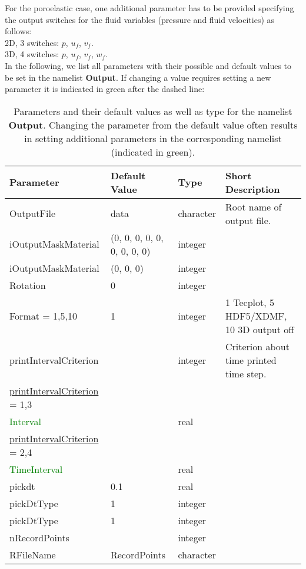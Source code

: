\documentclass[12pt,twoside]{article}
\begin{document}
\noindent
For the poroelastic case, one additional parameter has to be provided specifying the output switches for the fluid variables
(pressure and fluid velocities) as follows:\\
2D, 3 switches: $p$, $u_f$, $v_f$.\\
3D, 4 switches: $p$, $u_f$, $v_f$, $w_f$.\\

In the following, we list all parameters with their possible and default values to be set in the namelist \textbf{Output}.
If changing a value requires setting a new parameter it is indicated in green after the dashed line:\\

\begin{table}[H]
\caption{Parameters and their default values as well as type for the namelist \textbf{Output}.
         Changing the parameter from the default value often results in setting additional parameters
         in the corresponding namelist (indicated in green).}
\begin{center}
\begin{tabular}{|p{4cm}|p{2.7cm}|p{2cm}|p{4cm}|}
\hline
Parameter & Default Value & Type & Short Description \\
\hline
\hline
OutputFile & data & character & Root name of output file. \\
iOutputMaskMaterial & (0, 0, 0, 0, 0, 0, 0, 0, 0) & integer & \\
iOutputMaskMaterial & (0, 0, 0) & integer & \\
Rotation & 0 & integer & \\
Format = 1,5,10 & 1 & integer & 1 Tecplot, 5 HDF5/XDMF, 10 3D output off \\
printIntervalCriterion &  & integer & Criterion about time printed time step.\\
\hdashline
\uline{printIntervalCriterion} = 1,3 & & & \\
\textcolor{green}{Interval} & & real & \\
\hdashline
\uline{printIntervalCriterion} = 2,4 & & & \\
\textcolor{green}{TimeInterval} & & real & \\
\hline
pickdt & 0.1 & real & \\
pickDtType & 1 & integer & \\
pickDtType & 1 & integer & \\
nRecordPoints & & integer & \\
RFileName & RecordPoints & character & \\

\end{tabular}
\end{center}
\end{table}
\end{document}
